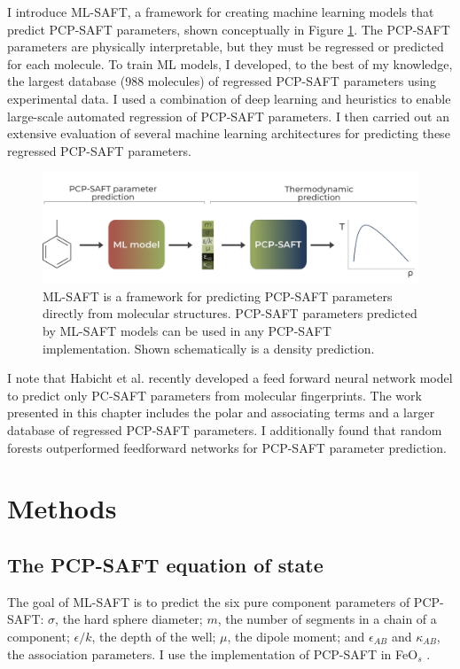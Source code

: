 I introduce ML-SAFT, a framework for creating machine learning models that predict PCP-SAFT parameters, shown conceptually in Figure \ref{fig:ML-SAFT_workflow}. The PCP-SAFT parameters are physically interpretable, but they must be regressed or predicted for each molecule.  To train ML models, I developed, to the best of my knowledge, the largest database (988 molecules) of regressed PCP-SAFT parameters using experimental data. I used a combination of deep learning and heuristics to enable large-scale automated regression of PCP-SAFT parameters. I then carried out an extensive evaluation of several machine learning architectures for predicting these regressed PCP-SAFT parameters.

\begin{figure}
    \centering
    \includegraphics[width=\textwidth]{gfx/Chapter08/mlsaft_workflow.png}
    \caption{ML-SAFT is a framework for predicting PCP-SAFT parameters directly from molecular structures. PCP-SAFT parameters predicted by ML-SAFT models can be used in any PCP-SAFT implementation. Shown schematically is a density prediction.}
    \label{fig:ML-SAFT_workflow}
\end{figure}

I note that Habicht et al. \cite{Habicht2023} recently developed a feed forward neural network model to predict only PC-SAFT parameters from molecular fingerprints. The work presented in this chapter includes the polar and associating terms and a larger database of regressed PCP-SAFT parameters. I additionally found that random forests outperformed feedforward networks for PCP-SAFT parameter prediction.


\section{Methods}


\subsection{The PCP-SAFT equation of state}

The goal of ML-SAFT is to predict the six pure component parameters of PCP-SAFT: $\sigma$, the hard sphere diameter; $m$, the number of segments in a chain of a component; $\epsilon/k$, the depth of the well; $\mu$, the dipole moment; and $\epsilon_{AB}$ and $\kappa_{AB}$, the association parameters. I use the implementation of PCP-SAFT in FeO$_{s}$ \cite{Rehner2023}.

